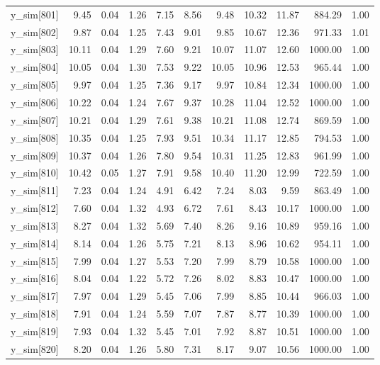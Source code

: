 \begin{table}[ht]
\begin{tabular}{rrrrrrrrrrr}
  y\_sim[801] & 9.45 & 0.04 & 1.26 & 7.15 & 8.56 & 9.48 & 10.32 & 11.87 & 884.29 & 1.00 \\ 
  y\_sim[802] & 9.87 & 0.04 & 1.25 & 7.43 & 9.01 & 9.85 & 10.67 & 12.36 & 971.33 & 1.01 \\ 
  y\_sim[803] & 10.11 & 0.04 & 1.29 & 7.60 & 9.21 & 10.07 & 11.07 & 12.60 & 1000.00 & 1.00 \\ 
  y\_sim[804] & 10.05 & 0.04 & 1.30 & 7.53 & 9.22 & 10.05 & 10.96 & 12.53 & 965.44 & 1.00 \\ 
  y\_sim[805] & 9.97 & 0.04 & 1.25 & 7.36 & 9.17 & 9.97 & 10.84 & 12.34 & 1000.00 & 1.00 \\ 
  y\_sim[806] & 10.22 & 0.04 & 1.24 & 7.67 & 9.37 & 10.28 & 11.04 & 12.52 & 1000.00 & 1.00 \\ 
  y\_sim[807] & 10.21 & 0.04 & 1.29 & 7.61 & 9.38 & 10.21 & 11.08 & 12.74 & 869.59 & 1.00 \\ 
  y\_sim[808] & 10.35 & 0.04 & 1.25 & 7.93 & 9.51 & 10.34 & 11.17 & 12.85 & 794.53 & 1.00 \\ 
  y\_sim[809] & 10.37 & 0.04 & 1.26 & 7.80 & 9.54 & 10.31 & 11.25 & 12.83 & 961.99 & 1.00 \\ 
  y\_sim[810] & 10.42 & 0.05 & 1.27 & 7.91 & 9.58 & 10.40 & 11.20 & 12.99 & 722.59 & 1.00 \\ 
  y\_sim[811] & 7.23 & 0.04 & 1.24 & 4.91 & 6.42 & 7.24 & 8.03 & 9.59 & 863.49 & 1.00 \\ 
  y\_sim[812] & 7.60 & 0.04 & 1.32 & 4.93 & 6.72 & 7.61 & 8.43 & 10.17 & 1000.00 & 1.00 \\ 
  y\_sim[813] & 8.27 & 0.04 & 1.32 & 5.69 & 7.40 & 8.26 & 9.16 & 10.89 & 959.16 & 1.00 \\ 
  y\_sim[814] & 8.14 & 0.04 & 1.26 & 5.75 & 7.21 & 8.13 & 8.96 & 10.62 & 954.11 & 1.00 \\ 
  y\_sim[815] & 7.99 & 0.04 & 1.27 & 5.53 & 7.20 & 7.99 & 8.79 & 10.58 & 1000.00 & 1.00 \\ 
  y\_sim[816] & 8.04 & 0.04 & 1.22 & 5.72 & 7.26 & 8.02 & 8.83 & 10.47 & 1000.00 & 1.00 \\ 
  y\_sim[817] & 7.97 & 0.04 & 1.29 & 5.45 & 7.06 & 7.99 & 8.85 & 10.44 & 966.03 & 1.00 \\ 
  y\_sim[818] & 7.91 & 0.04 & 1.24 & 5.59 & 7.07 & 7.87 & 8.77 & 10.39 & 1000.00 & 1.00 \\ 
  y\_sim[819] & 7.93 & 0.04 & 1.32 & 5.45 & 7.01 & 7.92 & 8.87 & 10.51 & 1000.00 & 1.00 \\ 
  y\_sim[820] & 8.20 & 0.04 & 1.26 & 5.80 & 7.31 & 8.17 & 9.07 & 10.56 & 1000.00 & 1.00 \\ 

\end{tabular}
\end{table}
